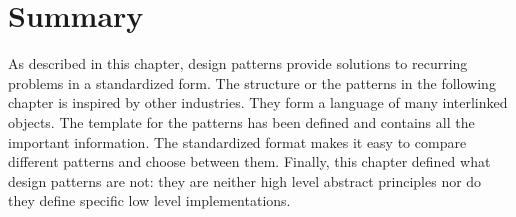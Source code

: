 \section{Summary}

As described in this chapter, design patterns provide solutions to recurring problems in a standardized form. The structure or the patterns in the following chapter is inspired by other industries. They form a language of many interlinked objects. The template for the patterns has been defined and contains all the important information. The standardized format makes it easy to compare different patterns and choose between them. Finally, this chapter defined what design patterns are not: they are neither high level abstract principles nor do they define specific low level implementations. 


